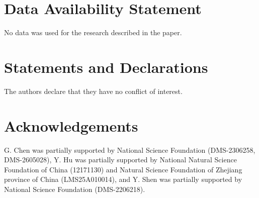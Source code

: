 \documentclass[11pt,reqno]{article}
\numberwithin{equation}{section}
\begin{document}
\section*{Data Availability Statement}
No data was used for the research described in the paper.


\section*{Statements and Declarations}

The authors declare that they have no conflict of interest.


\section*{Acknowledgements}

G. Chen was partially supported by National Science Foundation (DMS-2306258, DMS-2605028), Y. Hu was partially supported by National Natural Science Foundation of China (12171130) and Natural Science Foundation of Zhejiang province of China (LMS25A010014), and Y. Shen was
partially supported by National Science Foundation (DMS-2206218).
\end{document}
